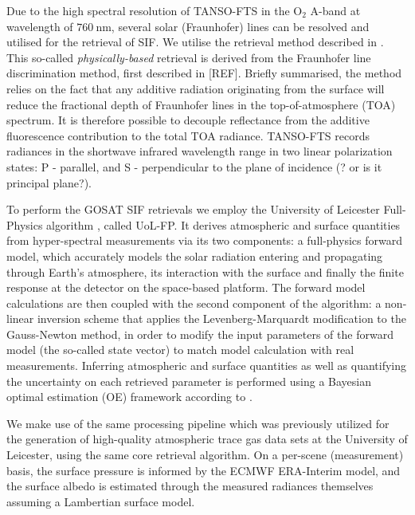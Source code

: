 \documentclass[preprint, a4paper, 10pt, times]{elsarticle}
\begin{document}
Due to the high spectral resolution of TANSO-FTS in the O$_2$ A-band at wavelength of $760\:\mathrm{nm}$, several solar (Fraunhofer) lines can be resolved and utilised for the retrieval of SIF. We utilise the retrieval method described in \citet{Frankenberg2011}. This so-called \textit{physically-based} retrieval is derived from the Fraunhofer line discrimination method, first described in [REF]. Briefly summarised, the method relies on the fact that any additive radiation originating from the surface will reduce the fractional depth of Fraunhofer lines in the top-of-atmosphere (TOA) spectrum. It is therefore possible to decouple reflectance from the additive fluorescence contribution to the total TOA radiance. TANSO-FTS records radiances in the shortwave infrared wavelength range in two linear polarization states: P - parallel, and S - perpendicular to the plane of incidence (? or is it principal plane?).

To perform the GOSAT SIF retrievals we employ the University of Leicester Full-Physics algorithm \citep{Cogan2012}, called UoL-FP. It derives atmospheric and surface quantities from hyper-spectral measurements via its two components: a full-physics forward model, which accurately models the solar radiation entering and propagating through Earth's atmosphere, its interaction with the surface and finally the finite response at the detector on the space-based platform. The forward model calculations are then coupled with the second component of the algorithm: a non-linear inversion scheme that applies the Levenberg-Marquardt modification to the Gauss-Newton method, in order to modify the input parameters of the forward model (the so-called state vector) to match model calculation with real measurements. Inferring atmospheric and surface quantities as well as quantifying the uncertainty on each retrieved parameter is performed using a Bayesian optimal estimation (OE) framework according to \citet{Rodgers2000}.

We make use of the same processing pipeline which was previously utilized for the generation of high-quality atmospheric trace gas data sets \citep{Buchwitz2017,Trent2018} at the University of Leicester, using the same core retrieval algorithm. On a per-scene (measurement) basis, the surface pressure is informed by the ECMWF ERA-Interim model, and the surface albedo is estimated through the measured radiances themselves assuming a Lambertian surface model.
\end{document}
